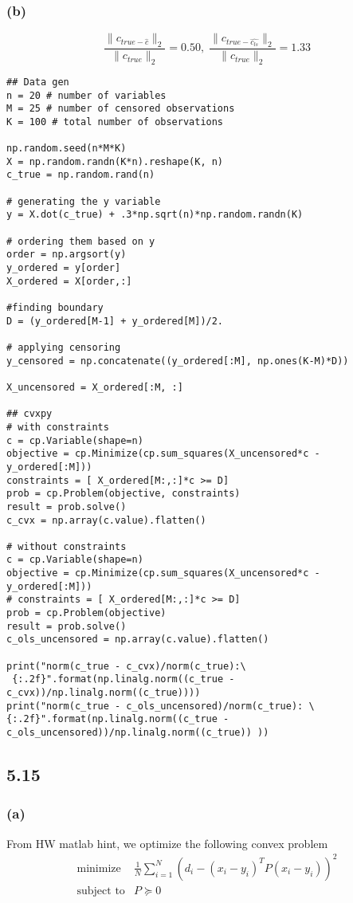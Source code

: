 \documentclass{article}
\begin{document}
\subsubsection*{(b)}
\[\dfrac{\|c_{true - \hat{c}}\|_2}{\|c_{true}\|_2} = 0.50,\; \dfrac{\|c_{true - \hat{c_{ls}}}\|_2}{\|c_{true}\|_2} =1.33\]
\begin{verbatim}
## Data gen
n = 20 # number of variables
M = 25 # number of censored observations
K = 100 # total number of observations

np.random.seed(n*M*K)
X = np.random.randn(K*n).reshape(K, n)
c_true = np.random.rand(n)

# generating the y variable
y = X.dot(c_true) + .3*np.sqrt(n)*np.random.randn(K)

# ordering them based on y
order = np.argsort(y)
y_ordered = y[order]
X_ordered = X[order,:]

#finding boundary
D = (y_ordered[M-1] + y_ordered[M])/2. 

# applying censoring
y_censored = np.concatenate((y_ordered[:M], np.ones(K-M)*D))

X_uncensored = X_ordered[:M, :]

## cvxpy
# with constraints
c = cp.Variable(shape=n)
objective = cp.Minimize(cp.sum_squares(X_uncensored*c - y_ordered[:M]))
constraints = [ X_ordered[M:,:]*c >= D]
prob = cp.Problem(objective, constraints)
result = prob.solve()
c_cvx = np.array(c.value).flatten()

# without constraints
c = cp.Variable(shape=n)
objective = cp.Minimize(cp.sum_squares(X_uncensored*c - y_ordered[:M]))
# constraints = [ X_ordered[M:,:]*c >= D]
prob = cp.Problem(objective)
result = prob.solve()
c_ols_uncensored = np.array(c.value).flatten()

print("norm(c_true - c_cvx)/norm(c_true):\
 {:.2f}".format(np.linalg.norm((c_true - c_cvx))/np.linalg.norm((c_true))))
print("norm(c_true - c_ols_uncensored)/norm(c_true): \
{:.2f}".format(np.linalg.norm((c_true - c_ols_uncensored))/np.linalg.norm((c_true)) ))
\end{verbatim}

\subsection*{5.15}
\subsubsection*{(a)}
From HW matlab hint, we optimize the following convex problem 
 \[  \boxed{  \begin{array}{ll}
    \mbox{minimize}   &  \frac{1}{N}\sum_{i=1}^{N}(d_i - (x_i-y_i)^TP(x_i-y_i))^2\\
    \mbox{subject to} & P \succeq 0
         \end{array} 
         }
  \]    
\end{document}
